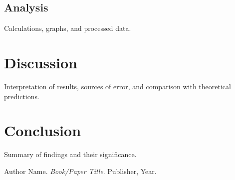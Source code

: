 \documentclass[12pt,a4paper]{article}
\begin{document}
\subsection{Analysis}
Calculations, graphs, and processed data.

\section{Discussion}
Interpretation of results, sources of error, and comparison with theoretical predictions.

\section{Conclusion}
Summary of findings and their significance.

\begin{thebibliography}{9}
Author Name. 
\textit{Book/Paper Title}. 
Publisher, Year.
\end{thebibliography}
\end{document}
